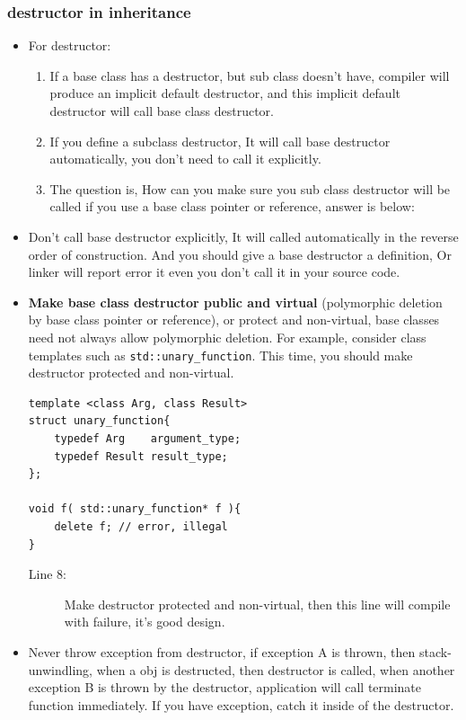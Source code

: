 \documentclass[a4paper,11pt,twoside]{book}
\begin{document}
\subsubsection{destructor in inheritance}
\begin{itemize}
	\item For destructor:
	\begin{enumerate}
		\item If a base class has a destructor, but sub class doesn't have,  compiler will produce an implicit default destructor, and this implicit default destructor will call base class destructor.
		
		\item If you define a subclass destructor, It will call base destructor automatically, you don't need to call it explicitly.
		
		\item The question is, How can you make sure you sub class destructor will be called if you use a base class pointer or reference, answer is below:
	\end{enumerate}
	
	\item Don't call base destructor explicitly, It will called automatically in the reverse order of construction.  And you should give a base destructor a definition, Or linker will report error it even you don't call it in your source code.
	
	\item \textbf{Make base class destructor public and virtual} (polymorphic deletion by base class pointer or reference), or protect and non-virtual, base classes need not always allow polymorphic deletion. For example, consider class templates such as \texttt{std::unary\_function}. This time, you should make destructor protected and non-virtual.
\begin{lstlisting}[numbers=none]
template <class Arg, class Result>
struct unary_function{
	typedef Arg    argument_type;
	typedef Result result_type;
};
	
void f( std::unary_function* f ){
	delete f; // error, illegal
}
\end{lstlisting}
\begin{description}
	\item[Line 8:] Make destructor protected and non-virtual, then this line will compile with failure, it's good design. 
\end{description}
	
	\item Never throw exception from destructor, if exception A is thrown, then stack-unwindling, when a obj is destructed, then destructor is called, when another exception B is thrown by the destructor, application will call terminate function immediately.  If you have exception, catch it inside of the destructor.
	
\end{itemize}
\end{document}
